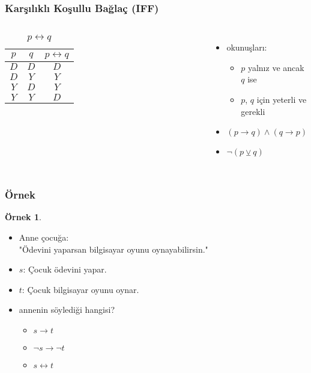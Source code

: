 \documentclass[dvipsnames]{beamer}
\theoremstyle{definition}
\theoremstyle{example}
\newtheorem{ornek}[theorem]{Örnek}
\theoremstyle{plain}
\begin{document}
\begin{frame}
  \frametitle{Karşılıklı Koşullu Bağlaç (IFF)}

  \begin{columns}
    \begin{table}
      \caption{$p \leftrightarrow q$}
      \begin{tabular}{|c|c||c|}\hline
        $p$ & $q$ & $p \leftrightarrow q$\\\hline\hline
        $D$ & $D$ & $D$\\\hline
        $D$ & $Y$ & $Y$\\\hline
        $Y$ & $D$ & $Y$\\\hline
        $Y$ & $Y$ & $D$\\\hline
      \end{tabular}
    \end{table}

    \pause
    \begin{itemize}
      \item okunuşları:
      \begin{itemize}
        \item $p$ yalnız ve ancak $q$ ise
        \item $p$, $q$ için yeterli ve gerekli
      \end{itemize}

      \pause
      \item $(p \rightarrow q) \wedge (q \rightarrow p)$
      \item $\neg (p \veebar q)$
    \end{itemize}
  \end{columns}
\end{frame}

\begin{frame}
  \frametitle{Örnek}

  \begin{ornek}
    \begin{itemize}
      \item Anne çocuğa:\\
        "Ödevini yaparsan bilgisayar oyunu oynayabilirsin."

      \pause
      \medskip
      \item $s$: Çocuk ödevini yapar.
      \item $t$: Çocuk bilgisayar oyunu oynar.

      \pause
      \medskip
      \item annenin söylediği hangisi?
      \begin{itemize}
        \item $s \rightarrow t$
        \item $\neg s \rightarrow \neg t$
        \item $s \leftrightarrow t$
      \end{itemize}
    \end{itemize}
  \end{ornek}
\end{frame}
\end{document}
